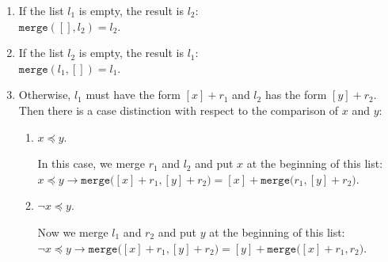 \begin{enumerate}
\item If the list $l_1$ is empty, the result is $l_2$: \\[0.2cm]
      \hspace*{1.3cm} 
      $\mathtt{merge}([], l_2) = l_2$.
\item If the list $l_2$  is empty, the result is $l_1$: \\[0.2cm]
      \hspace*{1.3cm} 
      $\mathtt{merge}(l_1, []) = l_1$.
\item Otherwise, $l_1$ must have the form $[x] + r_1$ and $l_2$ has the form $[y] + r_2$.
      Then there is a case distinction with respect to the comparison of $x$ and $y$:
      \begin{enumerate}
      \item $x \preceq y$.

            In this case, we merge $r_1$ and $l_2$ and put $x$ at the beginning of this list:\\[0.2cm]
            \hspace*{1.3cm} 
            $x \preceq y \rightarrow \mathtt{merge}\bigl([x]+r_1, [y]+r_2\bigr) = [x] + \mathtt{merge}\bigl(r_1,[y]+r_2\bigr)$.
      \item $\neg x \preceq y$.

            Now we merge $l_1$ and $r_2$ and put $y$ at the beginning of this list:\\[0.2cm]
            \hspace*{1.3cm} 
            $\neg x \preceq y \rightarrow \mathtt{merge}\bigl([x]+r_1, [y]+r_2\bigr) = [y] + \mathtt{merge}\bigl([x] + r_1,r_2\bigr)$.
      \end{enumerate}
\end{enumerate}

